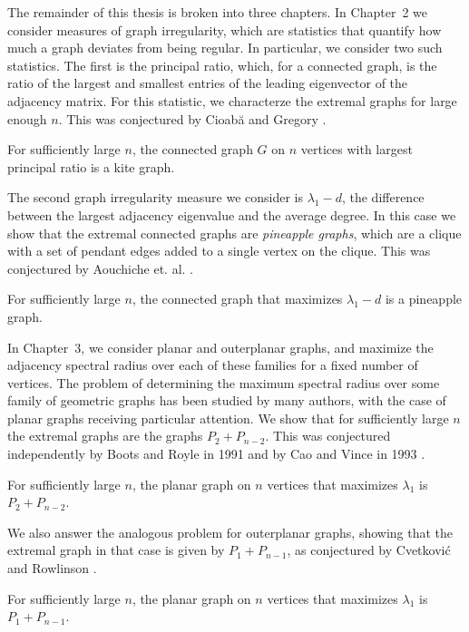 The remainder of this thesis is broken into three chapters.  In Chapter~2 we consider
measures of graph irregularity, which are statistics that quantify how much a graph deviates
from being regular.
In particular, we consider two such statistics. The first is the principal ratio, which,
for a connected graph, is the ratio of the largest and smallest entries of the leading
eigenvector of the adjacency matrix.  For this statistic, we characterze the extremal
graphs for large enough $n$.  This was conjectured by Cioab\u{a} and Gregory
\cite{CioabaGregory2007}.
\begin{theorem}\label{main_theorem}
  For sufficiently large $n$, the connected graph $G$ on $n$
  vertices with largest principal ratio is a kite graph.
\end{theorem}
\noindent The second graph irregularity measure we consider is  $\lambda_1 - d$,
the difference between the largest adjacency eigenvalue and the average degree.
In this case we show that the extremal connected graphs are \textit{pineapple graphs}, which
are a clique with a set of pendant edges added to a single vertex on the clique.
This was conjectured by Aouchiche et. al. \cite{AouchicheEtAl2008}.
\begin{theorem}
  For sufficiently large $n$, the connected graph that maximizes $\lambda_1 - d$
  is a pineapple graph.
\end{theorem}



In Chapter~3, we consider planar and outerplanar graphs, and maximize the adjacency
spectral radius over each of these families for a fixed number of vertices.  The problem
of determining the maximum spectral radius over some family of geometric graphs has been
studied by many authors, with the case of planar graphs receiving particular attention.
We show that for sufficiently large $n$ the extremal graphs are the graphs $P_2 + P_{n-2}$.
This was conjectured independently by Boots and Royle in 1991 \cite{BootsRoyle1991} and
by Cao and Vince in 1993 \cite{CaoVince1993}.
\begin{theorem}
  For sufficiently large $n$, the planar graph on $n$ vertices that maximizes $\lambda_1$
  is $P_2 + P_{n-2}$.
\end{theorem}
\noindent We also answer the analogous problem for outerplanar graphs, showing that
the extremal graph in that case is given by $P_1 + P_{n-1}$, as conjectured
by Cvetkovi\'{c} and Rowlinson \cite{CvetkovicRowlinson1990}.
\begin{theorem}
  For sufficiently large $n$, the planar graph on $n$ vertices that maximizes $\lambda_1$
  is $P_1 + P_{n-1}$.
\end{theorem}


